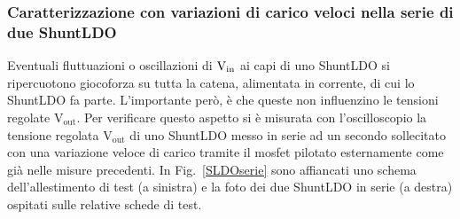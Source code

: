
\subsubsection{Caratterizzazione con variazioni di carico veloci nella serie di due ShuntLDO}

Eventuali fluttuazioni o oscillazioni di $\mathrm{V_{in}}$ ai capi di uno ShuntLDO si ripercuotono giocoforza su tutta la catena, alimentata in corrente, di cui lo ShuntLDO fa parte. L'importante per\`o, \`e che queste non influenzino le tensioni regolate $\mathrm{V_{out}}$.
Per verificare questo aspetto si è misurata con l'oscilloscopio la tensione regolata $\mathrm{V_{out}}$ di uno ShuntLDO messo in serie ad un secondo sollecitato con una variazione veloce di carico tramite il mosfet pilotato esternamente come già nelle misure precedenti.
In Fig.~\ref{SLDOserie} sono affiancati uno schema dell'allestimento di test (a sinistra) e la foto dei due ShuntLDO in serie (a destra) ospitati sulle relative schede di test. 

